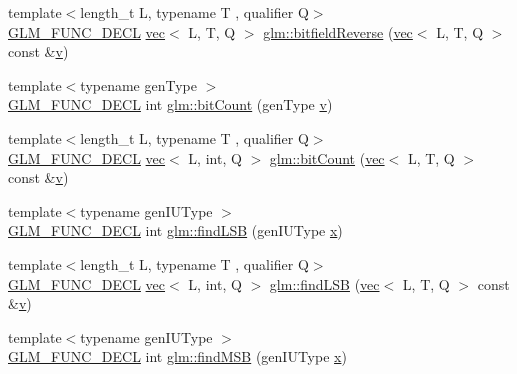 \begin{DoxyCompactItemize}
\item 
{\footnotesize template$<$length\+\_\+t L, typename T , qualifier Q$>$ }\\\hyperlink{setup_8hpp_ab2d052de21a70539923e9bcbf6e83a51}{G\+L\+M\+\_\+\+F\+U\+N\+C\+\_\+\+D\+E\+CL} \hyperlink{structglm_1_1vec}{vec}$<$ L, T, Q $>$ \hyperlink{group__core__func__integer_ga750a1d92464489b7711dee67aa3441b6}{glm\+::bitfield\+Reverse} (\hyperlink{structglm_1_1vec}{vec}$<$ L, T, Q $>$ const \&\hyperlink{_s_d_l__opengl_8h_a10a82eabcb59d2fcd74acee063775f90}{v})
\item 
{\footnotesize template$<$typename gen\+Type $>$ }\\\hyperlink{setup_8hpp_ab2d052de21a70539923e9bcbf6e83a51}{G\+L\+M\+\_\+\+F\+U\+N\+C\+\_\+\+D\+E\+CL} int \hyperlink{group__core__func__integer_ga44abfe3379e11cbd29425a843420d0d6}{glm\+::bit\+Count} (gen\+Type \hyperlink{_s_d_l__opengl_8h_a10a82eabcb59d2fcd74acee063775f90}{v})
\item 
{\footnotesize template$<$length\+\_\+t L, typename T , qualifier Q$>$ }\\\hyperlink{setup_8hpp_ab2d052de21a70539923e9bcbf6e83a51}{G\+L\+M\+\_\+\+F\+U\+N\+C\+\_\+\+D\+E\+CL} \hyperlink{structglm_1_1vec}{vec}$<$ L, int, Q $>$ \hyperlink{group__core__func__integer_gaac7b15e40bdea8d9aa4c4cb34049f7b5}{glm\+::bit\+Count} (\hyperlink{structglm_1_1vec}{vec}$<$ L, T, Q $>$ const \&\hyperlink{_s_d_l__opengl_8h_a10a82eabcb59d2fcd74acee063775f90}{v})
\item 
{\footnotesize template$<$typename gen\+I\+U\+Type $>$ }\\\hyperlink{setup_8hpp_ab2d052de21a70539923e9bcbf6e83a51}{G\+L\+M\+\_\+\+F\+U\+N\+C\+\_\+\+D\+E\+CL} int \hyperlink{group__core__func__integer_gaf74c4d969fa34ab8acb9d390f5ca5274}{glm\+::find\+L\+SB} (gen\+I\+U\+Type \hyperlink{_s_d_l__opengl_8h_ad0e63d0edcdbd3d79554076bf309fd47}{x})
\item 
{\footnotesize template$<$length\+\_\+t L, typename T , qualifier Q$>$ }\\\hyperlink{setup_8hpp_ab2d052de21a70539923e9bcbf6e83a51}{G\+L\+M\+\_\+\+F\+U\+N\+C\+\_\+\+D\+E\+CL} \hyperlink{structglm_1_1vec}{vec}$<$ L, int, Q $>$ \hyperlink{group__core__func__integer_ga4454c0331d6369888c28ab677f4810c7}{glm\+::find\+L\+SB} (\hyperlink{structglm_1_1vec}{vec}$<$ L, T, Q $>$ const \&\hyperlink{_s_d_l__opengl_8h_a10a82eabcb59d2fcd74acee063775f90}{v})
\item 
{\footnotesize template$<$typename gen\+I\+U\+Type $>$ }\\\hyperlink{setup_8hpp_ab2d052de21a70539923e9bcbf6e83a51}{G\+L\+M\+\_\+\+F\+U\+N\+C\+\_\+\+D\+E\+CL} int \hyperlink{group__core__func__integer_ga7e4a794d766861c70bc961630f8ef621}{glm\+::find\+M\+SB} (gen\+I\+U\+Type \hyperlink{_s_d_l__opengl_8h_ad0e63d0edcdbd3d79554076bf309fd47}{x})

\end{DoxyCompactItemize}
